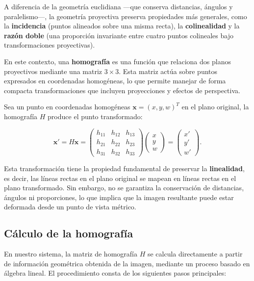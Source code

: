 A diferencia de la geometría euclidiana —que conserva distancias, ángulos y paralelismo—, la geometría proyectiva preserva propiedades más generales, como la \textbf{incidencia} (puntos alineados sobre una misma recta), la \textbf{colinealidad} y la \textbf{razón doble} (una proporción invariante entre cuatro puntos colineales bajo transformaciones proyectivas).

En este contexto, una \textbf{homografía} es una función que relaciona dos planos proyectivos mediante una matriz \(3 \times 3\). Esta matriz actúa sobre puntos expresados en coordenadas homogéneas, lo que permite manejar de forma compacta transformaciones que incluyen proyecciones y efectos de perspectiva.

Sea un punto en coordenadas homogéneas \(\mathbf{x} = (x, y, w)^T\) en el plano original, la homografía \(H\) produce el punto transformado:

\begin{equation}
\mathbf{x}' = H \mathbf{x} =
\begin{pmatrix}
h_{11} & h_{12} & h_{13} \\
h_{21} & h_{22} & h_{23} \\
h_{31} & h_{32} & h_{33}
\end{pmatrix}
\begin{pmatrix}
x \\ y \\ w
\end{pmatrix}
=
\begin{pmatrix}
x' \\ y' \\ w'
\end{pmatrix}.
\label{eq:homografia}
\end{equation}

Esta transformación tiene la propiedad fundamental de preservar la \textbf{linealidad}, es decir, las líneas rectas en el plano original se mapean en líneas rectas en el plano transformado. Sin embargo, no se garantiza la conservación de distancias, ángulos ni proporciones, lo que implica que la imagen resultante puede estar deformada desde un punto de vista métrico.

\subsection*{Cálculo de la homografía}

En nuestro sistema, la matriz de homografía \(H\) se calcula directamente a partir de información geométrica obtenida de la imagen, mediante un proceso basado en álgebra lineal. El procedimiento consta de los siguientes pasos principales:

